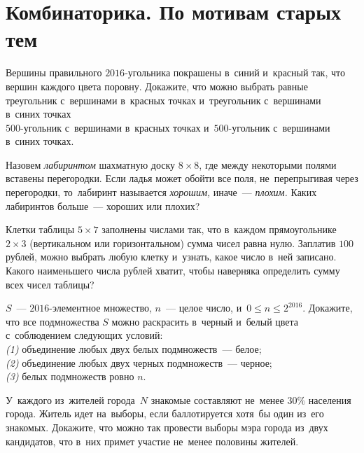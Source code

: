 
\section*{Комбинаторика. По мотивам старых тем}


\begin{problems}

\item
Вершины правильного $2016$-угольника покрашены в~синий и~красный так, что
вершин каждого цвета поровну.
Докажите, что можно выбрать равные
\\
\subproblem
треугольник с~вершинами в~красных точках и~треугольник с~вершинами в~синих
точках
\\
\subproblem
$500$-угольник с~вершинами в~красных точках и~$500$-угольник с~вершинами
в~синих точках.

\item
Назовем \emph{лабиринтом} шахматную доску $8 \times 8$, где между некоторыми
полями вставены перегородки.
Если ладья может обойти все поля, не~перепрыгивая через перегородки,
то~лабиринт называется \emph{хорошим,} иначе~--- \emph{плохим.}
Каких лабиринтов больше~--- хороших или плохих?

\item
Клетки таблицы $5 \times 7$ заполнены числами так, что в~каждом прямоугольнике
$2 \times 3$ (вертикальном или горизонтальном) сумма чисел равна нулю.
Заплатив $100$ рублей, можно выбрать любую клетку и~узнать, какое число в~ней
записано.
Какого наименьшего числа рублей хватит, чтобы наверняка определить сумму всех
чисел таблицы?

\item
$S$~--- $2016$-элементное множество, $n$~--- целое число,
и~$0 \leq n \leq 2^{2016}$.
Докажите, что все подмножества $S$ можно раскрасить в~черный и~белый цвета
с~соблюдением следующих условий:
\\
\textit{(1)} объединение любых двух белых подмножеств~--- белое;
\\
\textit{(2)} объединение любых двух черных подмножеств~--- черное;
\\
\textit{(3)} белых подмножеств ровно $n$.

\item
У~каждого из~жителей города~$N$ знакомые составляют не~менее $30\%$ населения
города.
Житель идет на~выборы, если баллотируется хотя~бы один из~его знакомых.
Докажите, что можно так провести выборы мэра города из~двух кандидатов, что
в~них примет участие не~менее половины жителей.


\end{problems}
